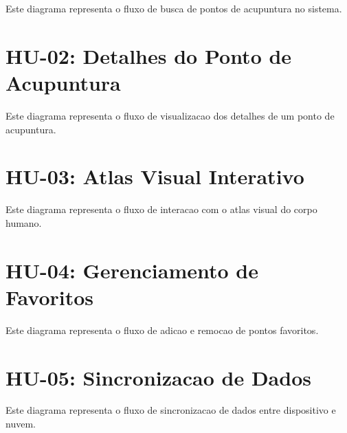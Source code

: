 \begin{apendicesenv}
Este diagrama representa o fluxo de busca de pontos de acupuntura no sistema.


\section{HU-02: Detalhes do Ponto de Acupuntura}
\label{apendice:seq-detalhes}

Este diagrama representa o fluxo de visualizacao dos detalhes de um ponto de acupuntura.


\section{HU-03: Atlas Visual Interativo}
\label{apendice:seq-atlas}

Este diagrama representa o fluxo de interacao com o atlas visual do corpo humano.


\section{HU-04: Gerenciamento de Favoritos}
\label{apendice:seq-favoritos}

Este diagrama representa o fluxo de adicao e remocao de pontos favoritos.


\section{HU-05: Sincronizacao de Dados}
\label{apendice:seq-sync}

Este diagrama representa o fluxo de sincronizacao de dados entre dispositivo e nuvem.


\end{apendicesenv}
